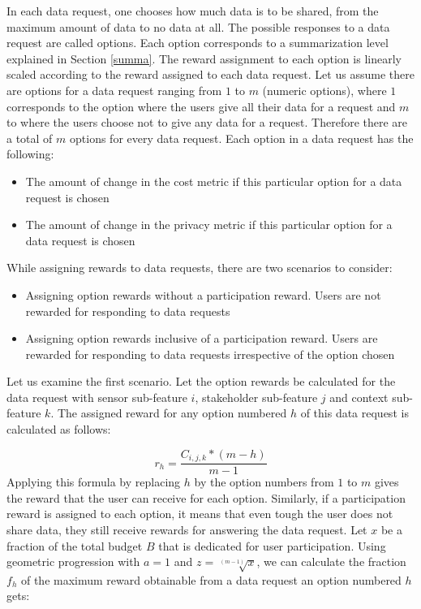 In each data request, one chooses how much data is to be shared, from the maximum amount of data to no data at all. The possible responses to a data request are called options. Each option corresponds to a summarization level explained in Section \ref{summa}. The reward assignment to each option is linearly scaled according
to the reward assigned to each data request. Let us assume there are options for a data request ranging from $1$ to $m$ (numeric options), where $1$ corresponds to the option where the users give all their data for a request and $m$ to where the users choose not to give any data for a request. Therefore there are a total of $m$ options for every data request. Each option in a data request has the following:

\begin{itemize}
\item The amount of change in the cost metric if this particular option for a data request is chosen
\item The amount of change in the privacy metric if this particular option for a data request is chosen
\end{itemize}

While assigning rewards to data requests, there are two scenarios to consider:

\begin{itemize}
\item Assigning option rewards without a participation reward. Users are not rewarded for responding to data requests
\item Assigning option rewards inclusive of a participation reward. Users are rewarded for responding to data requests irrespective of the option chosen
\end{itemize}

Let us examine the first scenario. Let the option rewards be calculated for the data request with sensor sub-feature $i$, stakeholder sub-feature $j$ and
context sub-feature $k$. The assigned reward for any option numbered $h$ of this data request is calculated as follows:

\begin{equation}
r_{h} =  \frac{C_{i,j,k}*(m-h)}{m-1}
\end{equation}
Applying this formula by replacing $h$ by the option numbers from $1$ to $m$ gives the reward that the user can receive for each option.
Similarly, if a participation reward is assigned to each option, it means that even tough the user does not share data, they still
receive rewards for answering the data request. Let $x$ be a fraction of the total budget $B$ that is dedicated for user participation. Using geometric progression with $a=1$ and $z=\sqrt[(m-1)]{x}$, we can calculate the fraction $f_{h}$ of the maximum reward obtainable from a data request an option numbered $h$ gets:


